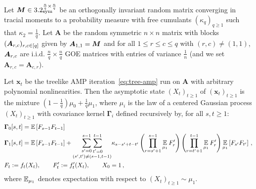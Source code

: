 \begin{theorem}\label{thm:communitySimple}
    Let $\bm M\in 3.2_{\mathrm{sym}}^{\frac n q\times \frac n q}$ be
    an orthogonally invariant
    random matrix converging in
    tracial moments to a probability measure with free cumulants $(\kappa_q)_{q\ge 1}$
    such that $\kappa_2 = \frac 1 q$.
    Let $\bm A$ be the random symmetric $n\times n$ matrix with blocks $({\bm A}_{r,c})_{r,c \in [q]}$ given by ${\bm A}_{1,1} = {\bm M}$ and 
    for all $1\le r\le c\le q$ with $(r,c)\neq (1,1)$, 
    ${\bm A}_{r,c}$ are i.i.d. $\frac n q\times \frac n q$ GOE matrices with entries of variance $\frac 1n$ (and we set $\bm A_{r,c} =\bm A_{c,r}$).
    
    Let $\bm x_t$ be the treelike AMP iteration~\cref{eq:tree-amp} run
    on $\bm A$ with arbitrary polynomial
    nonlinearities.
    Then the asymptotic state $(X_t)_{t\ge 1}$ of $(\bm x_t)_{t\ge 1}$ is the mixture $(1-\frac 1q)\mu_0 + \frac 1 q \mu_1$, where $\mu_i$ is the law
    of a centered Gaussian process
    $(X_t)_{t\ge 1}$ with covariance kernel $\bm \Gamma_i$
    defined recursively by, for
    all $s,t\ge 1$:
    \begin{align*}
        & \bm \Gamma_0[s,t] = \operatorname*{\mathbb{E}}\left[F_{s-1}F_{t-1}\right]\,\\
        & \bm {\Gamma}_1[s,t] = \operatorname*{\mathbb{E}}\left[F_{s-1}F_{t-1}\right]  + \underset{(s',t') \neq (s-1,t-1)}{\sum_{s'=0}^{s-1} \sum_{\substack{t'=0}}^{t-1}} \kappa_{s-s'+t-t'} 
        \left(\prod_{r=s'+1}^{s-1} \operatorname*{\mathbb{E}}_{\mu_1}F'_r\right) \left(\prod_{r=t'+1}^{t-1}\operatorname*{\mathbb{E}}_{\mu_1} F'_r \right) \operatorname*{\mathbb{E}}_{\mu_1}\left[F_{s'}F_{t'}\right]\,,\\
        & F_t := f_t(X_t), \qquad F'_t := f'_t(X_t), \qquad X_0 = 1\,,
    \end{align*}
    where $\operatorname*{\mathbb{E}}_{\mu_1}$ denotes
    expectation with respect to $(X_t)_{t\ge 1}\sim \mu_1$.
\end{theorem}

